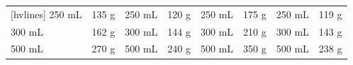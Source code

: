 \begin{table}
\begin{NiceTabular}{*{8}{m{.1\textwidth}}}[hvlines]
		250 mL                                 & 135 g & 250 mL                                  & 120 g & 250 mL                                   & 175 g & 250 mL                                      & 119 g \\
		300 mL                                 & 162 g & 300 mL                                  & 144 g & 300 mL                                   & 210 g & 300 mL                                      & 143 g \\
		500 mL                                 & 270 g & 500 mL                                  & 240 g & 500 mL                                   & 350 g & 500 mL                                      & 238 g \\
	\end{NiceTabular}
\end{table}

